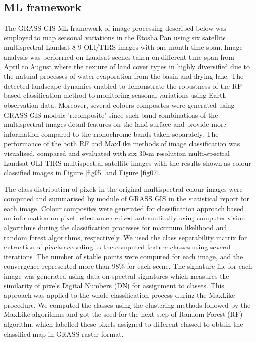 \documentclass[climate,article,submit,pdftex,moreauthors]{Definitions/mdpi}
\begin{document}
\subsection{ML framework}

The GRASS GIS ML framework of image processing described below was employed to map seasonal variations in the Etosha Pan using six satellite multispectral Landsat 8-9 OLI/TIRS images with one-month time span. Image analysis was performed on Landsat scenes taken on different time span from April to August where the texture of land cover types in highly diversified due to the natural processes of water evaporation from the basin and drying lake. The detected landscape dynamics enabled to demonstrate the robustness of the RF-based classification method to monitoring seasonal variations using Earth observation data. Moreover, several colours composites were generated using GRASS GIS module 'r.composite' since such band combinations of the multispectral images detail features on the land surface  and provide more information compared to the monochrome bands taken separately. The performance of the both RF and MaxLike methods of image classification was visualised, compared  and evaluated with six 30-m resolution multi-spectral Landsat OLI-TIRS multispectral satellite images with the results shown as colour classified images in Figure \ref{fig05} and Figure \ref{fig07}. 

The class distribution of pixels in the original multispectral colour images were computed and summarised by module of GRASS GIS in the statistical report for each image. Colour composites were generated for classification approach based on information on pixel reflectance derived automatically using computer vision algorithms during the classification processes for maximum likelihood and random forest algorithms, respectively. We used the class separability matrix for extraction of pixels according to the computed feature classes using several iterations. The number of stable points were computed for each image, and the convergence represented more than 98\% for each scene. The signature file for each image was generated using data on spectral signatures which measures the similarity  of pixels Digital Numbers (DN) for assignment to classes. This approach was applied to the whole classification process during the MaxLike procedure. We computed the classes using the clustering methods followed by the MaxLike algorithms and got the seed for the next step of Random Forest (RF) algorithm which labelled these pixels assigned to different classed to obtain the classified map in GRASS raster format. 
\end{document}
